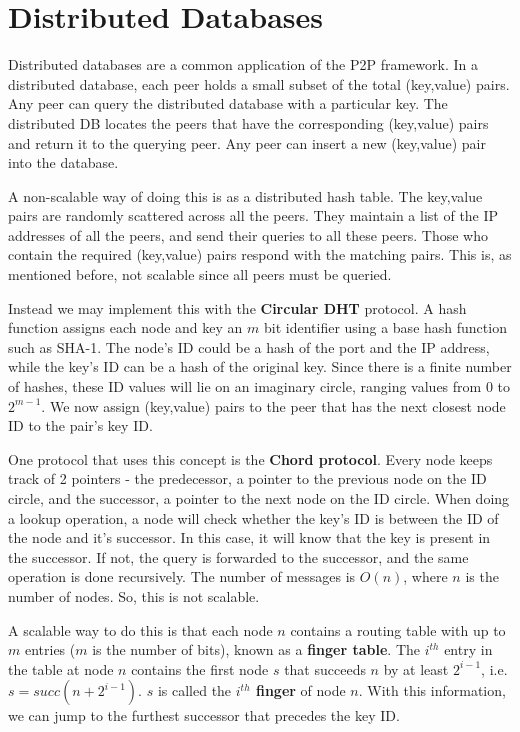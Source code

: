 \documentclass[12pt,letterpaper]{amsbook}
\theoremstyle{definition}
\begin{document}
\section{Distributed Databases}

Distributed databases are a common application of the P2P framework. In a distributed database, each peer holds a small subset of the total (key,value) pairs. Any peer can query the distributed database with a particular key. The distributed DB locates the peers that have the corresponding (key,value) pairs and return it to the querying peer. Any peer can insert a new (key,value) pair into the database. 

A non-scalable way of doing this is as a distributed hash table. The key,value pairs are randomly scattered across all the peers. They maintain a list of the IP addresses of all the peers, and send their queries to all these peers. Those who contain the required (key,value) pairs respond with the matching pairs. This is, as mentioned before, not scalable since all peers must be queried.

Instead we may implement this with the \textbf{Circular DHT}  protocol. A hash function assigns each node and key an $m$ bit identifier using a base hash function such as SHA-1. The node's ID could be a hash of the port and the IP address, while the key's ID can be a hash of the original key. Since there is a finite number of hashes, these ID values will lie on an imaginary circle, ranging values from $0$ to $2^{m-1}$. We now assign (key,value) pairs to the peer that has the next closest node ID to the pair's key ID.

One protocol that uses this concept is the \textbf{Chord protocol}. Every node keeps track of 2 pointers - the predecessor, a pointer to the previous node on the ID circle, and the successor, a pointer to the next node on the ID circle. When doing a lookup operation, a node will check whether the key's ID is between the ID of the node and it's successor. In this case, it will know that the key is present in the successor. If not, the query is forwarded to the successor, and the same operation is done recursively. The number of messages is $O(n)$, where $n$ is the number of nodes. So, this is not scalable.

A scalable way to do this is that each node $n$ contains a routing table with up to $m$ entries ($m$ is the number of bits), known as a \textbf{finger table}. The $i^{th}$ entry in the table at node $n$ contains the first node $s$ that succeeds $n$ by at least $2^{i-1}$, i.e. $s = succ(n+2^{i-1})$. $s$ is called the \textbf{ $i^{th}$ finger} of node $n$. With this information, we can jump to the furthest successor that precedes the key ID.
\end{document}
